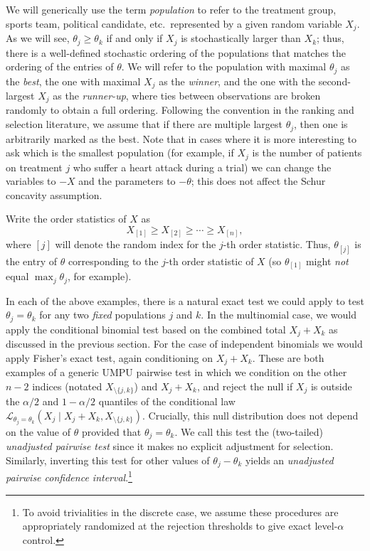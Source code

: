 \documentclass[11pt]{article}
\theoremstyle{definition}
\theoremstyle{custom}
\begin{document}
We will generically use the term {\em population} to refer to the treatment group, sports team, political candidate, etc.\ represented by a given random variable $X_j$. As we will see, $\theta_j \ge \theta_k$ if and only if $X_j$ is stochastically larger than $X_k$; thus, there is a well-defined stochastic ordering of the populations that matches the ordering of the entries of $\theta$. We will refer to the population with maximal $\theta_j$ as the {\em best}, the one with maximal $X_j$ as the {\em winner}, and the one with the second-largest $X_j$ as the {\em runner-up}, where ties between observations are broken randomly to obtain a full ordering. Following the convention in the ranking and selection literature, we assume that if there are multiple largest $\theta_j$, then one is arbitrarily marked as the best. Note that in cases where it is more interesting to ask which is the smallest population (for example, if $X_j$ is the number of patients on treatment $j$ who suffer a heart attack during a trial) we can change the variables to $-X$ and the parameters to $-\theta$; this does not affect the Schur concavity assumption. 

Write the order statistics of $X$ as
$$X_{[1]} \ge X_{[2]} \ge \cdots \ge X_{[n]},$$
where $[j]$ will denote the random index for the $j$-th order statistic. Thus, $\theta_{[j]}$ is the entry of $\theta$ corresponding to the $j$-th order statistic of $X$ (so $\theta_{[1]}$ might {\em not} equal $\max_j \theta_j$, for example).

In each of the above examples, there is a natural exact test we could apply to test $\theta_j=\theta_k$ for any two {\em fixed} populations $j$ and $k$. In the multinomial case, we would apply the conditional binomial test based on the combined total $X_j+X_k$ as discussed in the previous section. For the case of independent binomials we would apply Fisher's exact test, again conditioning on $X_j+X_k$. These are both examples of a generic UMPU pairwise test in which we condition on the other $n-2$ indices (notated $X_{\setminus \{j,k\}}$) and $X_j+X_k$, and reject the null if $X_j$ is outside the $\alpha/2$ and $1-\alpha/2$ quantiles of the conditional law $\mathcal{L}_{\theta_j=\theta_k}(X_j \mid X_j+X_k, X_{\setminus\{j,k\}})$. Crucially, this null distribution does not depend on the value of $\theta$ provided that $\theta_j=\theta_k$. We call this test the (two-tailed) {\em unadjusted pairwise test} since it makes no explicit adjustment for selection. Similarly, inverting this test for other values of $\theta_j-\theta_k$ yields an {\em unadjusted pairwise confidence interval}.\footnote{To avoid trivialities in the discrete case, we assume these procedures are appropriately randomized at the rejection thresholds to give exact level-$\alpha$ control.}
\end{document}
